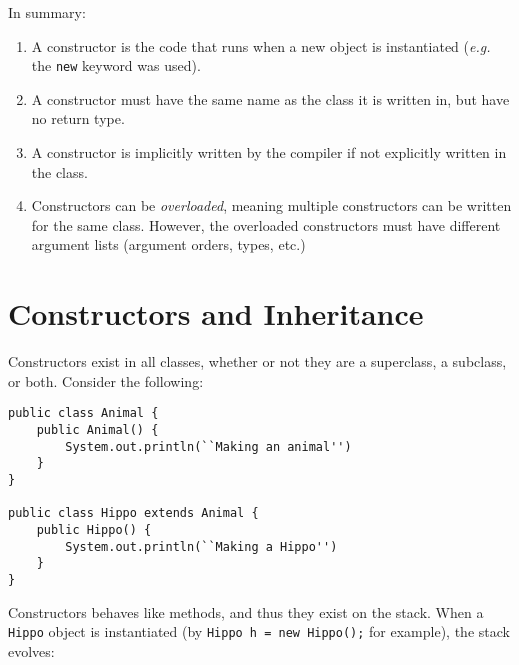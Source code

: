 \documentclass{tufte-handout}
\begin{document}
    In summary:

    \begin{enumerate}
        \item A constructor is the code that runs when a new object is instantiated (\textit{e.g.} the \texttt{new} keyword was used).
        \item A constructor must have the same name as the class it is written in, but have no return type.
        \item A constructor is implicitly written by the compiler if not explicitly written in the class.
        \item Constructors can be \emph{overloaded}, meaning multiple constructors can be written for the same class. However, the overloaded constructors must have different argument lists (argument orders, types, etc.)
    \end{enumerate}

    \section*{Constructors and Inheritance}
    Constructors exist in all classes, whether or not they are a superclass, a subclass, or both. Consider the following:

    \begin{lstlisting}
public class Animal {
    public Animal() {
        System.out.println(``Making an animal'')
    }
}

public class Hippo extends Animal {
    public Hippo() {
        System.out.println(``Making a Hippo'')
    }
} 
    \end{lstlisting}

    Constructors behaves like methods, and thus they exist on the stack. When a \texttt{Hippo} object is instantiated (by \texttt{Hippo h = new Hippo();} for example), the stack evolves:
        
\end{document}
